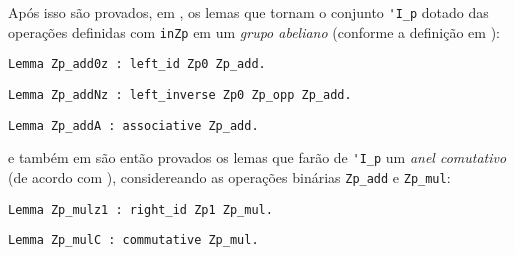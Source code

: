 Após isso são provados, em \cite{mathcomp-zmodp}, os lemas que tornam o conjunto \lstinline[language = coq]{'I_p} dotado das operações definidas com \lstinline[language = coq]{inZp} em um \textit{grupo abeliano} (conforme a definição em \cite[p.~41-46]{book:2399854}):
    \begin{lstlisting}[language=coq,frame=single,tabsize=1]
Lemma Zp_add0z : left_id Zp0 Zp_add.
    \end{lstlisting}
    \begin{lstlisting}[language=coq,frame=single,tabsize=1]
Lemma Zp_addNz : left_inverse Zp0 Zp_opp Zp_add.
    \end{lstlisting}
    \begin{lstlisting}[language=coq,frame=single,tabsize=1]
Lemma Zp_addA : associative Zp_add.
    \end{lstlisting}
e também em \cite{mathcomp-zmodp} são então provados os lemas que farão de \lstinline[language = coq]{'I_p} um \textit{anel comutativo} (de acordo com \cite[p.~46-47]{book:2399854}), considereando as operações binárias \lstinline[language = coq]{Zp_add} e \lstinline[language = coq]{Zp_mul}:
    \begin{lstlisting}[language=coq,frame=single,tabsize=1]
Lemma Zp_mulz1 : right_id Zp1 Zp_mul.
    \end{lstlisting}
    \begin{lstlisting}[language=coq,frame=single,tabsize=1]
Lemma Zp_mulC : commutative Zp_mul.
    \end{lstlisting}
